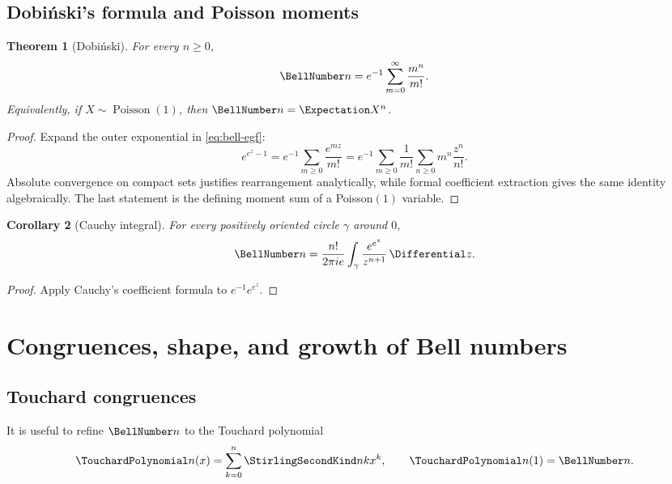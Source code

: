 \documentclass[11pt,a4paper,oneside,openany]{book}
\newtheorem{theorem}{Theorem}[chapter]
\newtheorem{corollary}[theorem]{Corollary}
\theoremstyle{definition}
\theoremstyle{remark}
\begin{document}
\section{Dobiński's formula and Poisson moments}
\begin{theorem}[Dobiński]\label{thm:dobinski}
For every $n\ge0$,
\begin{equation}\label{eq:dobinski}
 \BellNumber n=e^{-1}\sum_{m=0}^{\infty}\frac{m^n}{m!}.
\end{equation}
Equivalently, if $X\sim\operatorname{Poisson}(1)$, then $\BellNumber n=\Expectation X^n$.
\end{theorem}
\begin{proof}
Expand the outer exponential in \eqref{eq:bell-egf}:
\[
 e^{e^z-1}=e^{-1}\sum_{m\ge0}\frac{e^{mz}}{m!}
 =e^{-1}\sum_{m\ge0}\frac1{m!}\sum_{n\ge0}m^n\frac{z^n}{n!}.
\]
Absolute convergence on compact sets justifies rearrangement analytically, while
formal coefficient extraction gives the same identity algebraically.  The last
statement is the defining moment sum of a Poisson$(1)$ variable.
\end{proof}

\begin{corollary}[Cauchy integral]
For every positively oriented circle $\gamma$ around $0$,
\begin{equation}\label{eq:bell-cauchy}
 \BellNumber n=\frac{n!}{2\pi i e}\int_\gamma
       \frac{e^{e^z}}{z^{n+1}}\,\Differential z.
\end{equation}
\end{corollary}
\begin{proof}
Apply Cauchy's coefficient formula to $e^{-1}e^{e^z}$.
\end{proof}

\chapter{Congruences, shape, and growth of Bell numbers}

\section{Touchard congruences}
It is useful to refine $\BellNumber n$ to the Touchard polynomial
\[
 \TouchardPolynomial n(x)=\sum_{k=0}^{n}\StirlingSecondKind nk x^k,
 \qquad \TouchardPolynomial n(1)=\BellNumber n.
\]
\end{document}
